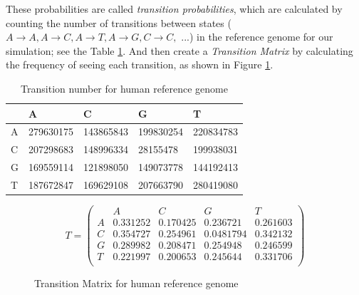 \documentclass[11pt,a4paper]{report}
\begin{document}
These probabilities are called \emph{transition probabilities}, which are 
calculated by counting the number of transitions between states ($ A \rightarrow A, 
A\rightarrow C, A \rightarrow T, A \rightarrow G, C \rightarrow C,$ ...)
in the reference genome for our simulation; see the Table
\ref{transition-table}.
And then create a \emph{Transition Matrix} by calculating the frequency of seeing each transition,
as shown in Figure \ref{transition-matrix}.\\

\begin{table}[h]
  \begin{tabular}{ |  p{1cm} | p{2cm} | p{2cm} | p{2cm} | p{2cm} |}
    \hline
  	  
 	             & A   & C & G & T \\ \hline
      A  & 279630175  & 143865843 & 199830254 & 220834783 \\ \hline
 	  C	 & 207298683  & 148996334 & 28155478 & 199938031\\ \hline
 	  G	 & 169559114  & 121898050 & 149073778 & 144192413\\ \hline
 	  T  & 187672847  & 169629108  & 207663790 & 280419080\\ \hline
      
 	  
   \end{tabular}
  \caption{Transition number for human reference genome}
 \label{transition-table}
\end{table}



\begin{figure}[H]
 \centering
\[
T = 
 \begin{pmatrix}
   &  A  & C & G & T  \\
 A & 0.331252 & 0.170425 & 0.236721 & 0.261603  \\
 C & 0.354727 & 0.254961 & 0.0481794 & 0.342132  \\
 G & 0.289982 & 0.208471 & 0.254948 & 0.246599  \\
 T & 0.221997 & 0.200653 & 0.245644 & 0.331706 \\
  
 \end{pmatrix}
\]
 \caption{Transition Matrix for human reference genome}
 \label{transition-matrix}
\end{figure}
\end{document}
